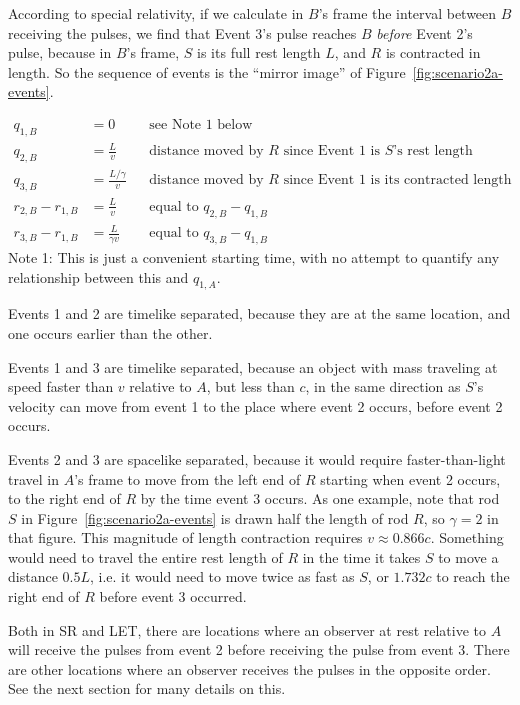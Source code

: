 \documentclass[a4paper]{article}
\theoremstyle{plain}
\theoremstyle{definition}
\begin{document}
According to special relativity, if we calculate in $B$'s frame the
interval between $B$ receiving the pulses, we find that Event 3's
pulse reaches $B$ {\em before} Event 2's pulse, because in $B$'s frame, $S$
is its full rest length $L$, and $R$ is contracted in length.  So the
sequence of events is the ``mirror image'' of
Figure~\ref{fig:scenario2a-events}.

\begin{align*}
q_{1,B} & = 0 & & \text{see Note 1 below}\\
q_{2,B} & = \frac{L}{v} & & \text{distance moved by $R$ since Event 1 is $S$'s rest length} \\
q_{3,B} & = \frac{L/\gamma}{v} & & \text{distance moved by $R$ since Event 1 is its contracted length} \\
r_{2,B} - r_{1,B} & = \frac{L}{v} & & \text{equal to $q_{2,B} - q_{1,B}$} \\
r_{3,B} - r_{1,B} & = \frac{L}{\gamma v} & & \text{equal to $q_{3,B} - q_{1,B}$}
\end{align*}
Note 1: This is just a convenient starting time, with no attempt to
quantify any relationship between this and $q_{1,A}$.

Events 1 and 2 are timelike separated, because they are at the same
location, and one occurs earlier than the other.

Events 1 and 3 are timelike separated, because an object with mass
traveling at speed faster than $v$ relative to $A$, but less than $c$,
in the same direction as $S$'s velocity can move from event 1 to the
place where event 2 occurs, before event 2 occurs.

Events 2 and 3 are spacelike separated, because it would require
faster-than-light travel in $A$'s frame to move from the left end of
$R$ starting when event 2 occurs, to the right end of $R$ by the time
event 3 occurs.  As one example, note that rod $S$ in
Figure~\ref{fig:scenario2a-events} is drawn half the length of rod $R$,
so $\gamma=2$ in that figure.  This magnitude of length contraction
requires $v \approx 0.866c$.  Something would need to travel the
entire rest length of $R$ in the time it takes $S$ to move a distance
$0.5L$, i.e. it would need to move twice as fast as $S$, or $1.732c$
to reach the right end of $R$ before event 3 occurred.

Both in SR and LET, there are locations where an observer at rest
relative to $A$ will receive the pulses from event 2 before receiving
the pulse from event 3.  There are other locations where an observer
receives the pulses in the opposite order.  See the next section for
many details on this.
\end{document}
